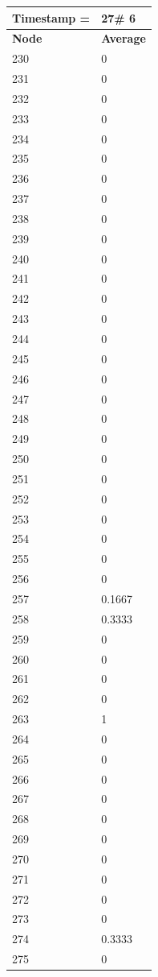 \begin{tabular}{|l||l|}
\hline
\textbf{Timestamp =} & \textbf{27}\# 6\\\hline
	\textbf{Node} & \textbf{Average} \\ \hline
\hline
	230 & 0 \\ \hline
	231 & 0 \\ \hline
	232 & 0 \\ \hline
	233 & 0 \\ \hline
	234 & 0 \\ \hline
	235 & 0 \\ \hline
	236 & 0 \\ \hline
	237 & 0 \\ \hline
	238 & 0 \\ \hline
	239 & 0 \\ \hline
	240 & 0 \\ \hline
	241 & 0 \\ \hline
	242 & 0 \\ \hline
	243 & 0 \\ \hline
	244 & 0 \\ \hline
	245 & 0 \\ \hline
	246 & 0 \\ \hline
	247 & 0 \\ \hline
	248 & 0 \\ \hline
	249 & 0 \\ \hline
	250 & 0 \\ \hline
	251 & 0 \\ \hline
	252 & 0 \\ \hline
	253 & 0 \\ \hline
	254 & 0 \\ \hline
	255 & 0 \\ \hline
	256 & 0 \\ \hline
	257 & 0.1667 \\ \hline
	258 & 0.3333 \\ \hline
	259 & 0 \\ \hline
	260 & 0 \\ \hline
	261 & 0 \\ \hline
	262 & 0 \\ \hline
	263 & 1 \\ \hline
	264 & 0 \\ \hline
	265 & 0 \\ \hline
	266 & 0 \\ \hline
	267 & 0 \\ \hline
	268 & 0 \\ \hline
	269 & 0 \\ \hline
	270 & 0 \\ \hline
	271 & 0 \\ \hline
	272 & 0 \\ \hline
	273 & 0 \\ \hline
	274 & 0.3333 \\ \hline
	275 & 0 \\ \hline
\end{tabular}

